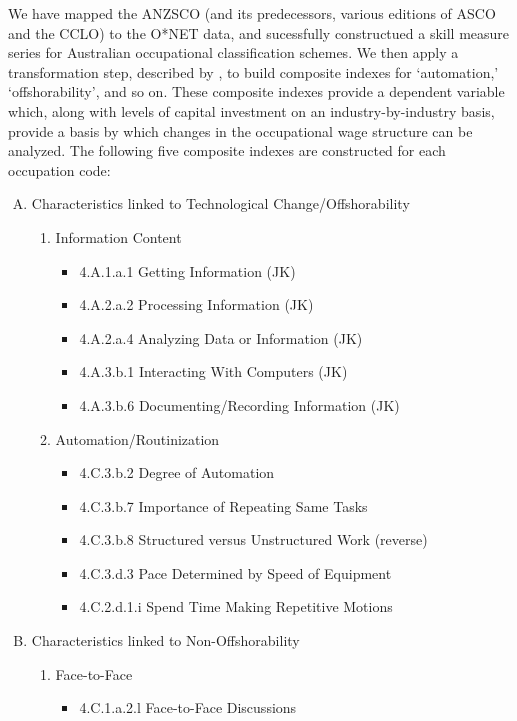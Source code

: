 We have mapped the ANZSCO (and its predecessors, various editions of ASCO and the CCLO) to the O*NET data, and sucessfully constructued a skill measure series for Australian occupational classification schemes. We then apply a transformation step, described by \citet{Firpo2011}, to build composite indexes for `automation,' `offshorability', and so on. These composite indexes provide a dependent variable which, along with levels of capital investment on an industry-by-industry basis, provide a basis by which changes in the occupational wage structure can be analyzed. The following five composite indexes are constructed for each occupation code:


\begin{enumerate}[A.]
\item Characteristics linked to Technological Change/Offshorability
\begin{enumerate}[1.]
\item Information Content 
  \begin{itemize}
  \item 4.A.1.a.1 Getting Information (JK)
  \item 4.A.2.a.2 Processing Information (JK) 
  \item 4.A.2.a.4 Analyzing Data or Information (JK) 
  \item 4.A.3.b.1 Interacting With Computers (JK) 
  \item 4.A.3.b.6 Documenting/Recording Information (JK)
  \end{itemize}
\item Automation/Routinization 
  \begin{itemize}
  \item 4.C.3.b.2 Degree of Automation 
  \item 4.C.3.b.7 Importance of Repeating Same Tasks 
  \item 4.C.3.b.8 Structured versus Unstructured Work (reverse) 
  \item 4.C.3.d.3 Pace Determined by Speed of Equipment 
  \item 4.C.2.d.1.i Spend Time Making Repetitive Motions
  \end{itemize}
\end{enumerate}
\item Characteristics linked to Non-Offshorability 
\begin{enumerate}[1.]
\item Face-to-Face
\begin{itemize}
  \item 4.C.1.a.2.l Face-to-Face Discussions 

\end{itemize}
\end{enumerate}
\end{enumerate}
